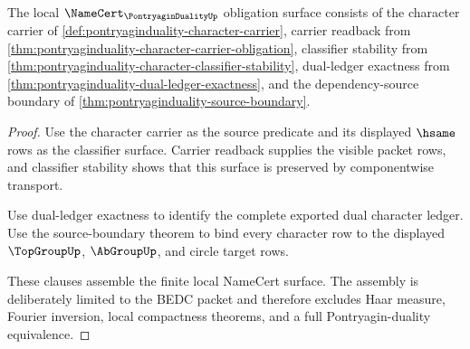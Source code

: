 \begin{theorem}
\label{thm:pontryaginduality-namecert-obligation-surface}
The local $\NameCert_{\PontryaginDualityUp}$ obligation surface consists of
the character carrier of
\autoref{def:pontryaginduality-character-carrier}, carrier readback from
\autoref{thm:pontryaginduality-character-carrier-obligation}, classifier
stability from
\autoref{thm:pontryaginduality-character-classifier-stability}, dual-ledger
exactness from \autoref{thm:pontryaginduality-dual-ledger-exactness}, and the
dependency-source boundary of
\autoref{thm:pontryaginduality-source-boundary}.
\end{theorem}
\begin{proof}
Use the character carrier as the source predicate and its displayed
$\hsame$ rows as the classifier surface. Carrier readback supplies the visible
packet rows, and classifier stability shows that this surface is preserved by
componentwise transport.

Use dual-ledger exactness to identify the complete exported dual character
ledger. Use the source-boundary theorem to bind every character row to the
displayed $\TopGroupUp$, $\AbGroupUp$, and circle target rows.

These clauses assemble the finite local NameCert surface. The assembly is
deliberately limited to the BEDC packet and therefore excludes Haar measure,
Fourier inversion, local compactness theorems, and a full Pontryagin-duality
equivalence.
\end{proof}

